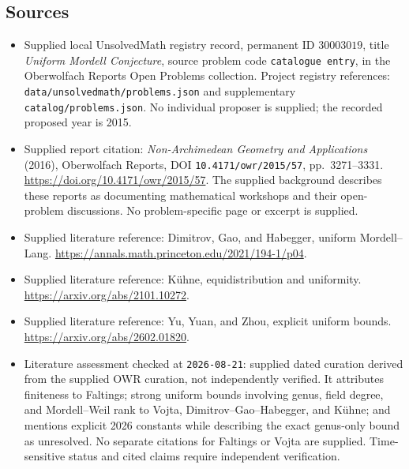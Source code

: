 \documentclass[11pt]{article}
\begin{document}
\subsection{Sources}
\begin{itemize}
\item Supplied local UnsolvedMath registry record, permanent ID \(30003019\), title \emph{Uniform Mordell Conjecture}, source problem code \texttt{catalogue entry}, in the Oberwolfach Reports Open Problems collection. Project registry references: \texttt{data/unsolvedmath/problems.json} and supplementary \texttt{catalog/problems.json}. No individual proposer is supplied; the recorded proposed year is 2015.
\item Supplied report citation: \emph{Non-Archimedean Geometry and Applications} (2016), Oberwolfach Reports, DOI \texttt{10.4171/owr/2015/57}, pp.\ 3271--3331. \url{https://doi.org/10.4171/owr/2015/57}. The supplied background describes these reports as documenting mathematical workshops and their open-problem discussions. No problem-specific page or excerpt is supplied.
\item Supplied literature reference: Dimitrov, Gao, and Habegger, uniform Mordell--Lang. \url{https://annals.math.princeton.edu/2021/194-1/p04}.
\item Supplied literature reference: K\"uhne, equidistribution and uniformity. \url{https://arxiv.org/abs/2101.10272}.
\item Supplied literature reference: Yu, Yuan, and Zhou, explicit uniform bounds. \url{https://arxiv.org/abs/2602.01820}.
\item Literature assessment checked at \texttt{2026-08-21}: supplied dated curation derived from the supplied OWR curation, not independently verified. It attributes finiteness to Faltings; strong uniform bounds involving genus, field degree, and Mordell--Weil rank to Vojta, Dimitrov--Gao--Habegger, and K\"uhne; and mentions explicit 2026 constants while describing the exact genus-only bound as unresolved. No separate citations for Faltings or Vojta are supplied. Time-sensitive status and cited claims require independent verification.
\end{itemize}
\end{document}
